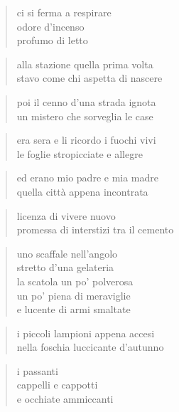 \begin{verse}
    ci si ferma a respirare\\
    odore d'incenso\\
    profumo di letto
\end{verse}

\clearpage


\begin{verse}
    alla stazione quella prima volta\\
    stavo come chi aspetta di nascere
\end{verse}

\begin{verse}
    poi il cenno d'una strada ignota\\
    un mistero che sorveglia le case
\end{verse}

\begin{verse}
    era sera e li ricordo i fuochi vivi\\
    le foglie stropicciate e allegre
\end{verse}

\begin{verse}
    ed erano mio padre e mia madre\\
    quella città appena incontrata
\end{verse}

\begin{verse}
    licenza di vivere nuovo\\
    promessa di interstizi tra il cemento
\end{verse}

\clearpage


\begin{verse}
    uno scaffale nell'angolo\\
    stretto d'una gelateria\\
    la scatola un po' polverosa\\
    un po' piena di meraviglie\\
    e lucente di armi smaltate
\end{verse}

\begin{verse}
    i piccoli lampioni appena accesi\\
    nella foschia luccicante d'autunno
\end{verse}

\begin{verse}
    i passanti\\
    cappelli e cappotti\\
    e occhiate ammiccanti
\end{verse}

